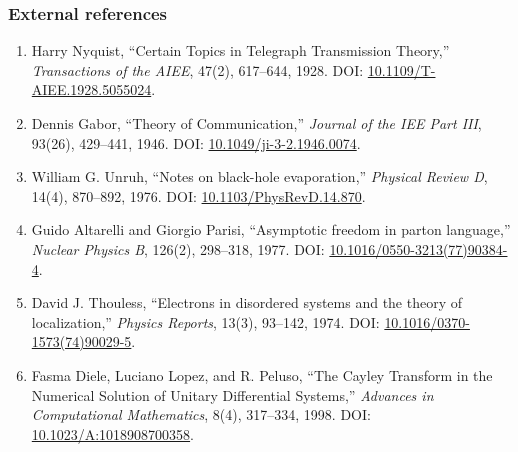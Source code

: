 \documentclass[
  a4paper,
]{article}
\providecommand{\tightlist}{%
  \setlength{\itemsep}{0pt}\setlength{\parskip}{0pt}}
\begin{document}
\subsubsection{External references}\label{external-references}

\begin{enumerate}
\def\labelenumi{\arabic{enumi}.}
\setcounter{enumi}{6}
\tightlist
\item
  Harry Nyquist, ``Certain Topics in Telegraph Transmission Theory,''
  \emph{Transactions of the AIEE}, 47(2), 617--644, 1928. DOI:
  \href{https://doi.org/10.1109/T-AIEE.1928.5055024}{10.1109/T-AIEE.1928.5055024}.
\item
  Dennis Gabor, ``Theory of Communication,'' \emph{Journal of the IEE
  Part III}, 93(26), 429--441, 1946. DOI:
  \href{https://doi.org/10.1049/ji-3-2.1946.0074}{10.1049/ji-3-2.1946.0074}.
\item
  William G. Unruh, ``Notes on black-hole evaporation,'' \emph{Physical
  Review D}, 14(4), 870--892, 1976. DOI:
  \href{https://doi.org/10.1103/PhysRevD.14.870}{10.1103/PhysRevD.14.870}.
\item
  Guido Altarelli and Giorgio Parisi, ``Asymptotic freedom in parton
  language,'' \emph{Nuclear Physics B}, 126(2), 298--318, 1977. DOI:
  \href{https://doi.org/10.1016/0550-3213(77)90384-4}{10.1016/0550-3213(77)90384-4}.
\item
  David J. Thouless, ``Electrons in disordered systems and the theory of
  localization,'' \emph{Physics Reports}, 13(3), 93--142, 1974. DOI:
  \href{https://doi.org/10.1016/0370-1573(74)90029-5}{10.1016/0370-1573(74)90029-5}.
\item
  Fasma Diele, Luciano Lopez, and R. Peluso, ``The Cayley Transform in
  the Numerical Solution of Unitary Differential Systems,''
  \emph{Advances in Computational Mathematics}, 8(4), 317--334, 1998.
  DOI:
  \href{https://doi.org/10.1023/A:1018908700358}{10.1023/A:1018908700358}.
\end{enumerate}
\end{document}
